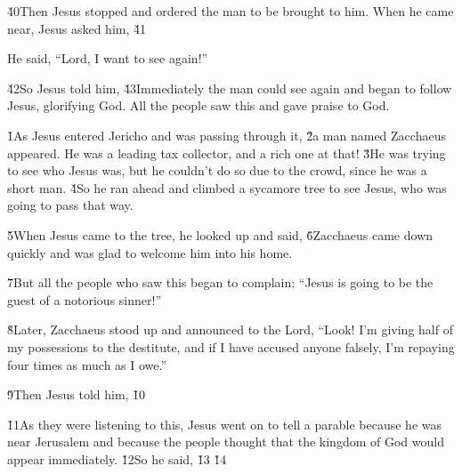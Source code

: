 \v{40}Then Jesus stopped and ordered the man to be brought to him. When he came near, Jesus asked him, \v{41}

He said, ``Lord, I want to see again!''

\v{42}So Jesus told him,  \v{43}Immediately the man could see again and began to follow Jesus, glorifying God. All the people saw this and gave praise to God.

\v{1}As Jesus entered Jericho and was passing through it, \v{2}a man named Zacchaeus appeared. He was a leading tax collector, and a rich one at that! \v{3}He was trying to see who Jesus was, but he couldn't do so due to the crowd, since he was a short man. \v{4}So he ran ahead and climbed a sycamore tree to see Jesus, who was going to pass that way.

\v{5}When Jesus came to the tree, he looked up and said,  \v{6}Zacchaeus came down quickly and was glad to welcome him into his home.

\v{7}But all the people who saw this began to complain: ``Jesus is going to be the guest of a notorious sinner!''

\v{8}Later, Zacchaeus stood up and announced to the Lord, ``Look! I'm giving half of my possessions to the destitute, and if I have accused anyone falsely, I'm repaying four times as much as I owe.''

\v{9}Then Jesus told him,  \v{10}

\v{11}As they were listening to this, Jesus went on to tell a parable because he was near Jerusalem and because the people thought that the kingdom of God would appear immediately. \v{12}So he said,  \v{13}  \v{14}

